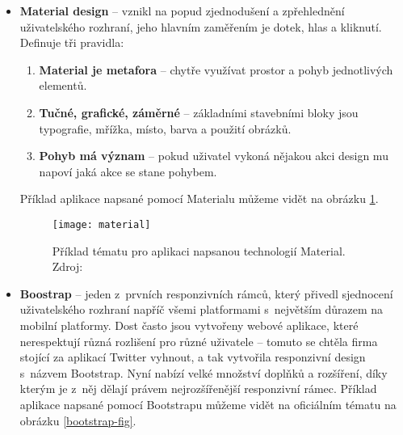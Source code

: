 \begin{itemize}
\item \textbf{Material design} -- vznikl na popud zjednodušení a zpřehlednění uživatelského rozhraní, jeho hlavním zaměřením je dotek, hlas a kliknutí. Definuje tři pravidla:
\begin{enumerate}
  \item \textbf{Material je metafora} -- chytře využívat prostor a pohyb jednotlivých elementů.
  \item \textbf{Tučné, grafické, záměrné} -- základními stavebními bloky jsou typografie, mřížka, místo, barva a použití obrázků.
  \item \textbf{Pohyb má význam} -- pokud uživatel vykoná nějakou akci design mu napoví jaká akce se stane pohybem. \cite{material}
\end{enumerate}
Příklad aplikace napsané pomocí Materialu můžeme vidět na obrázku \ref{material-fig}.

\begin{figure}[h!]
\centering
\texttt{[image: material]}
\caption[Příklad tématu pro aplikaci napsanou technologií Material]{Příklad tématu pro aplikaci napsanou technologií Material. Zdroj: \cite{material}}
\label{material-fig}
\end{figure}

\item \textbf{Boostrap} -- jeden z~prvních responzivních rámců, který přivedl sjednocení uživatelského rozhraní napříč všemi platformami s~největším důrazem na mobilní platformy. Dost často jsou vytvořeny webové aplikace, které nerespektují různá rozlišení pro různé uživatele -- tomuto se chtěla firma stojící za aplikací Twitter vyhnout, a tak vytvořila responzivní design s~názvem Bootstrap. Nyní nabízí velké množství doplňků a rozšíření, díky kterým je z~něj dělají právem nejrozšířenější responzivní rámec. \cite{bootstrap} Příklad aplikace napsané pomocí Bootstrapu můžeme vidět na oficiálním tématu na obrázku \ref{bootstrap-fig}.


\end{itemize}
